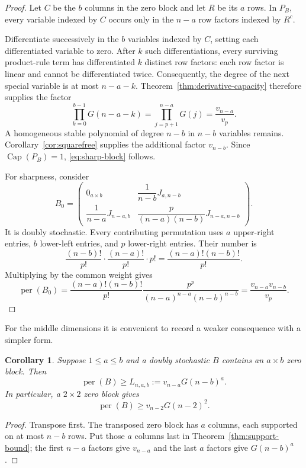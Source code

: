 \documentclass[11pt]{article}
\newtheorem{corollary}[theorem]{Corollary}
\theoremstyle{definition}
\newcommand{\per}{\operatorname{per}}
\newcommand{\pcap}{\operatorname{Cap}}
\newcommand{\1}{\mathbf{1}}
\begin{document}
\begin{proof}
Let $C$ be the $b$ columns in the zero block and let $R$ be its $a$ rows.  In $P_B$, every variable indexed by $C$ occurs only in the $n-a$ row factors indexed by $R^c$.

Differentiate successively in the $b$ variables indexed by $C$, setting each differentiated variable to zero.  After $k$ such differentiations, every surviving product-rule term has differentiated $k$ distinct row factors: each row factor is linear and cannot be differentiated twice.  Consequently, the degree of the next special variable is at most $n-a-k$.  Theorem~\ref{thm:derivative-capacity} therefore supplies the factor
\[
 \prod_{k=0}^{b-1}G(n-a-k)
 =\prod_{j=p+1}^{n-a}G(j)
 =\frac{v_{n-a}}{v_p}.
\]
A homogeneous stable polynomial of degree $n-b$ in $n-b$ variables remains.  Corollary~\ref{cor:squarefree} supplies the additional factor $v_{n-b}$.  Since $\pcap(P_B)=1$, \eqref{eq:sharp-block} follows.

For sharpness, consider
\[
 B_0=
 \begin{pmatrix}
  0_{a\times b} & \dfrac1{n-b}J_{a,n-b}\\[2mm]
  \dfrac1{n-a}J_{n-a,b} &
  \dfrac{p}{(n-a)(n-b)}J_{n-a,n-b}
 \end{pmatrix}.
\]
It is doubly stochastic.  Every contributing permutation uses $a$ upper-right entries, $b$ lower-left entries, and $p$ lower-right entries.  Their number is
\[
 \frac{(n-b)!}{p!}\cdot\frac{(n-a)!}{p!}\cdot p!
 =\frac{(n-a)!(n-b)!}{p!}.
\]
Multiplying by the common weight gives
\[
 \per(B_0)
 =\frac{(n-a)!(n-b)!}{p!}
  \frac{p^p}{(n-a)^{n-a}(n-b)^{n-b}}
 =\frac{v_{n-a}v_{n-b}}{v_p}.
\]
\end{proof}

For the middle dimensions it is convenient to record a weaker consequence with a simpler form.

\begin{corollary}\label{cor:weak-block}
Suppose $1\le a\le b$ and a doubly stochastic $B$ contains an $a\times b$ zero block.  Then
\[
 \per(B)\ge L_{n,a,b}:=v_{n-a}G(n-b)^a.
 \tag{3.8}\label{eq:weak-block}
\]
In particular, a $2\times2$ zero block gives
\[
 \per(B)\ge v_{n-2}G(n-2)^2.
 \tag{3.9}\label{eq:two-by-two}
\]
\end{corollary}

\begin{proof}
Transpose first.  The transposed zero block has $a$ columns, each supported on at most $n-b$ rows.  Put those $a$ columns last in Theorem~\ref{thm:support-bound}; the first $n-a$ factors give $v_{n-a}$ and the last $a$ factors give $G(n-b)^a$.
\end{proof}
\end{document}
